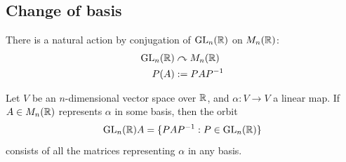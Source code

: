 \documentclass{../../template/note}
\begin{document}
    \subsection{Change of basis}

    There is a natural action by conjugation of \(\operatorname{GL}_n(\mathbb R)\) on \(M_n(\mathbb R)\):
    \begin{align*}
        \operatorname{GL}_n(\mathbb R) &\curvearrowright M_n(\mathbb R) \\
        P(A) &:= PAP^{-1}
    \end{align*}
    
    \begin{proposition}
        Let \(V\) be an \(n\)-dimensional vector space over \(\mathbb R\), and \(\alpha: V \to V\) a linear map. If \(A \in M_n(\mathbb R)\) represents \(\alpha\) in some basis, then the orbit
        \[
            \operatorname{GL}_n(\mathbb R)A = \{PAP^{-1}: P \in \operatorname{GL}_n(\mathbb R)\}
        \]
        consists of all the matrices representing \(\alpha\) in any basis.
    \end{proposition}
    
\end{document}
